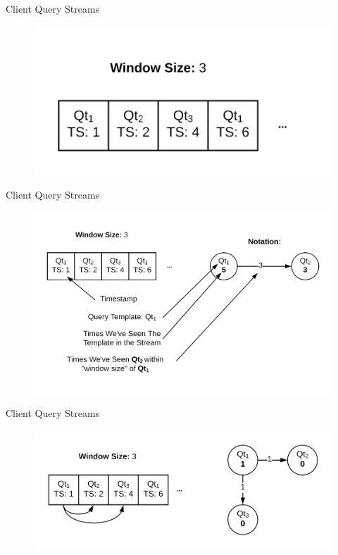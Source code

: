 \documentclass[10pt]{beamer}
\begin{document}
\begin{frame}[fragile]{Client Query Streams}
    \begin{figure}
        \includegraphics[scale=0.2]{apollo_client_query_stream_2}
    \end{figure}
\end{frame}

\begin{frame}[fragile]{Client Query Streams}
    \begin{figure}
        \includegraphics[scale=0.2]{apollo_client_query_stream_2_1}
    \end{figure}
\end{frame}



\begin{frame}[fragile]{Client Query Streams}
    \begin{figure}
        \includegraphics[scale=0.2]{apollo_client_query_stream_3}
    \end{figure}
\end{frame}
\end{document}
